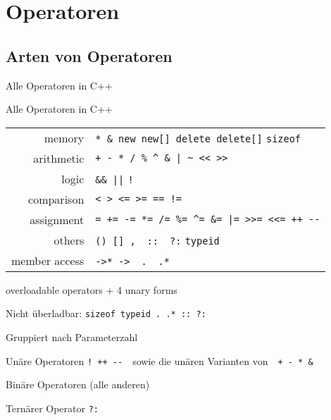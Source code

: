 \section {Operatoren}

\subsection{Arten von Operatoren}

\newcommand{\cppop}[1]{ \texttt{#1} }
\newcommand{\pppp}{}


\begin{frame}[fragile]{Alle Operatoren in C++}
	\begin{block}{Alle Operatoren in C++}
		\begin{tabular}{r|l}
			memory			&	\verb|* & new new[] delete delete[]| \verb|sizeof|					\pause \\
			arithmetic		&	\verb!+ - * / % ^ & | ~ << >>!									\pause \\
			logic			&	\verb!&& ||! \verb|!|											\pause \\
			comparison		&	\verb|< > <= >= == !=|											\pause \\
			assignment		&	\verb!= += -= *= /= %= ^= &= |= >>= <<= ++ --!					\pause \\
			others			&	\verb|() [] ,|~~\verb|::|~~\verb|?:| \verb|typeid|				\pause \\
			member access	&	\verb|->* ->|~~\verb|.|~~\verb|.*|								\pause \\
		\end{tabular}
	\end{block}
	
	\vspace{2em}
	
	 overloadable operators + 4 unary forms
		
		Nicht überladbar: \verb|sizeof typeid . .* :: ?:|
\end{frame}


\begin{frame}[fragile]{Gruppiert nach Parameterzahl}
	\onslide<+->
		\begin{block}{Unäre Operatoren}
			\verb|! ++ --|~~sowie die unären Varianten von~~\verb|+ - * &|
		\end{block}
	
	\vspace{2em}
	
	\onslide<+->
		\begin{block}{Binäre Operatoren}
			(alle anderen)
		\end{block}
	
	\vspace{2em}
	
	\onslide<+->
		\begin{block}{Ternärer Operator}
			\verb|?:|
		\end{block}
\end{frame}




